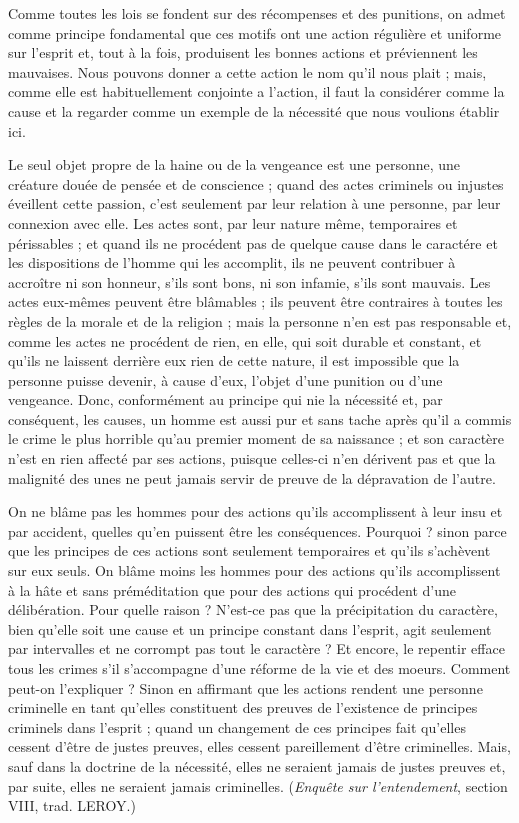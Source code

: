 Comme toutes les lois se fondent sur des récompenses
et des punitions, on admet comme principe fondamental
que ces motifs ont une action régulière et uniforme sur
l'esprit et, tout à la fois, produisent les bonnes actions et
préviennent les mauvaises. Nous pouvons donner a cette
action le nom qu’il nous plait ; mais, comme elle est habituellement
conjointe a l’action, il faut la considérer comme
la cause et la regarder comme un exemple de la nécessité
que nous voulions établir ici.

Le seul objet propre de la haine ou de la vengeance est
une personne, une créature douée de pensée et de conscience ;
quand des actes criminels ou injustes éveillent
cette passion, c’est seulement par leur relation à une
personne, par leur connexion avec elle. Les actes sont,
par leur nature même, temporaires et périssables ; et
quand ils ne procédent pas de quelque cause dans le
caractére et les dispositions de l'homme qui les accomplit,
ils ne peuvent contribuer à accroître ni son honneur,
s’ils sont bons, ni son infamie, s’ils sont mauvais. Les
actes eux-mêmes peuvent être blâmables ; ils peuvent être
contraires à toutes les règles de la morale et de la religion ;
mais la personne n’en est pas responsable et, comme les
actes ne procédent de rien, en elle, qui soit durable et
constant, et qu’ils ne laissent derrière eux rien de cette
nature, il est impossible que la personne puisse devenir,
à cause d’eux, l’objet d’une punition ou d’une vengeance.
Donc, conformément au principe qui nie la nécessité et,
par conséquent, les causes, un homme est aussi pur et
sans tache après qu’il a commis le crime le plus horrible
qu’au premier moment de sa naissance ; et son caractère
n’est en rien affecté par ses actions, puisque celles-ci n’en
dérivent pas et que la malignité des unes ne peut jamais
servir de preuve de la dépravation de l’autre.

On ne blâme pas les hommes pour des actions qu’ils
accomplissent à leur insu et par accident, quelles qu’en
puissent être les conséquences. Pourquoi ? sinon parce
que les principes de ces actions sont seulement temporaires
et qu'ils s’achèvent sur eux seuls. On blâme moins
les hommes pour des actions qu’ils accomplissent à la
hâte et sans préméditation que pour des actions qui
procédent d’une délibération. Pour quelle raison ? N’est-ce
pas que la précipitation du caractère, bien qu’elle soit une
cause et un principe constant dans l’esprit, agit seulement
par intervalles et ne corrompt pas tout le caractère ?
Et encore, le repentir efface tous les crimes s’il s’accompagne
d’une réforme de la vie et des moeurs. Comment peut-on
l'expliquer ? Sinon en affirmant que les actions rendent
une personne criminelle en tant qu’elles constituent des
preuves de l’existence de principes criminels dans l’esprit ;
quand un changement de ces principes fait qu’elles cessent
d’être de justes preuves, elles cessent pareillement d’être
criminelles. Mais, sauf dans la doctrine de la nécessité,
elles ne seraient jamais de justes preuves et, par suite,
elles ne seraient jamais criminelles. ({\it Enquête sur l’entendement},
section VIII, trad. L{\footnotesize EROY}.)

